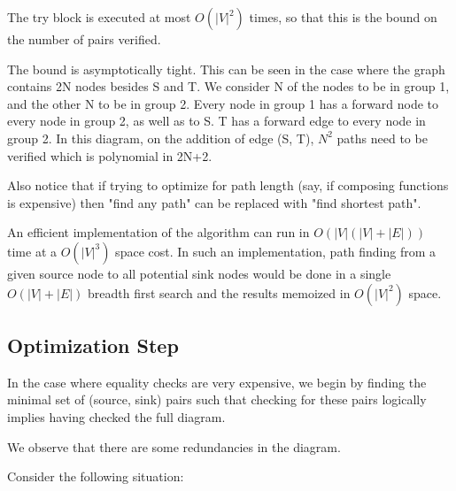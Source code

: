 \documentclass[sigplan,review,anonymous]{acmart}
\begin{document}
The try block is executed at most $O(|V|^2)$ times, so that this is the bound on the number of pairs verified.

The bound is asymptotically tight. This can be seen in the case where the graph contains 2N nodes besides S and T. We consider N of the nodes to be in group 1, and the other N to be in group 2. Every node in group 1 has a forward node to every node in group 2, as well as to S. T has a forward edge to every node in group 2. In this diagram, on the addition of edge (S, T), $N^2$ paths need to be verified which is polynomial in 2N+2.

Also notice that if trying to optimize for path length (say, if composing functions is expensive) then "find any path" can be replaced with "find shortest path".

An efficient implementation of the algorithm can run in $O(|V|(|V|+|E|))$ time at a $O(|V|^3)$ space cost. In such an implementation, path finding from a given source node to all potential sink nodes would be done in a single $O(|V|+|E|)$ breadth first search and the results memoized in $O(|V|^2)$ space.

\subsection{Optimization Step}

In the case where equality checks are very expensive, we begin by finding the minimal set of (source, sink) pairs such that checking for these pairs logically implies having checked the full diagram.

We observe that there are some redundancies in the diagram.

Consider the following situation:
\end{document}
